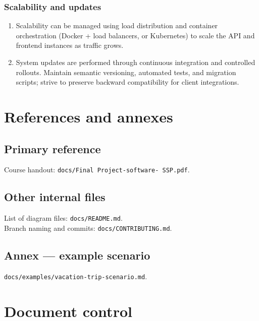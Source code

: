 \documentclass[11pt,a4paper]{article}
\begin{document}
\subsubsection{Scalability and updates}
\begin{enumerate}
	\item Scalability can be managed using load distribution and container orchestration (Docker + load balancers, or Kubernetes) to scale the API and frontend instances as traffic grows.
	\item System updates are performed through continuous integration and controlled rollouts. Maintain semantic versioning, automated tests, and migration scripts; strive to preserve backward compatibility for client integrations.
\end{enumerate}

\section{References and annexes}
\label{sec:refs}

\subsection{Primary reference}

Course handout: \texttt{docs/Final Project-software- SSP.pdf}.

\subsection{Other internal files}

\noindent List of diagram files: \texttt{docs/README.md}.\\
Branch naming and commits: \texttt{docs/CONTRIBUTING.md}.

\subsection{Annex --- example scenario}
\label{sec:annex}

\texttt{docs/examples/vacation-trip-scenario.md}.

\section{Document control}
\end{document}

